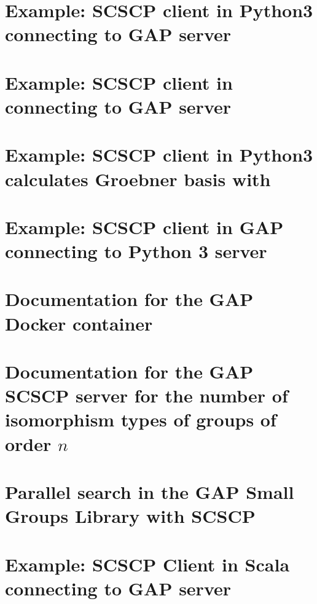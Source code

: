 \documentclass{deliverablereport}
\begin{document}
\section{Example: SCSCP client in Python3 connecting to GAP server}\label{python3-to-GAP}


\section{Example: SCSCP client in \Sage connecting to GAP server}\label{SageMath-to-GAP}


\section{Example: SCSCP client in Python3 calculates Groebner basis with \Singular}\label{Python3sympy-to-GAP-Singular}



\section{Example: SCSCP client in GAP connecting to Python 3 server}\label{GAP-to-Python3numpy}


\section{Documentation for the GAP Docker container}\label{SCSCP-with-GAP-docker}


\section{Documentation for the GAP SCSCP server for the number of isomorphism types of groups of order $n$}\label{Gnu-SCSCP-server}


\section{Parallel search in the GAP Small Groups Library with SCSCP}
\label{Parallel-GAP-SCSCP}


\section{Example: SCSCP Client in Scala connecting to GAP server}
\label{mmt-simple-example-SCSCP}


\end{document}
